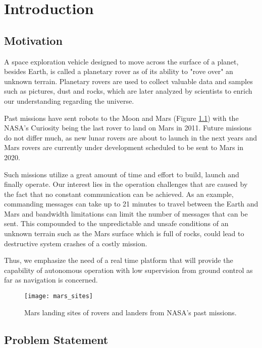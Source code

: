 \label{Chapter1}

\chapter{Introduction}

\section{Motivation}
A space exploration vehicle designed to move across the surface of a planet,
besides Earth, is called a planetary rover as of its ability to "rove over"
an unknown terrain.
Planetary rovers are used to collect valuable data and samples such as
pictures, dust and rocks, which are later analyzed by scientists to enrich
our understanding regarding the universe.

Past missions have sent robots to the Moon and Mars (Figure
\ref{fig:mars_sites}) with the NASA's Curiosity being the last rover to
land on Mars in 2011.
Future missions do not differ much, as new lunar rovers are about to launch
in the next years and Mars rovers are currently under development scheduled
to be sent to Mars in 2020.

Such missions utilize a great amount of time and effort to build,
launch and finally operate.
Our interest lies in the operation challenges that are caused by the fact
that no constant communication can be achieved.
As an example, commanding messages can take up to 21 minutes to travel
between the Earth and Mars and bandwidth limitations can limit the number
of messages that can be sent.
This compounded to the unpredictable and unsafe conditions of
an unknown terrain such as the Mars surface which is full of rocks,
could lead to destructive system crashes of a costly mission.

Thus, we emphasize the need of a real time platform that will provide the
capability of autonomous operation with low supervision from ground control
as far as navigation is concerned.

\begin{figure}[h!]
    \centering
    \texttt{[image: mars\_sites]}
    \decoRule
    \caption[Mars landing sites]{
        Mars landing sites of rovers and landers from NASA's past missions.
    }
    \label{fig:mars_sites}
\end{figure}

\section{Problem Statement}

